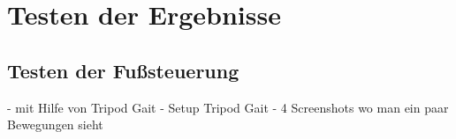 \chapter{Testen der Ergebnisse}
\label{kap5}

\section{Testen der Fußsteuerung}

- mit Hilfe von Tripod Gait
- Setup Tripod Gait
- 4 Screenshots wo man ein paar Bewegungen sieht